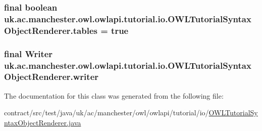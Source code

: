 \hypertarget{classuk_1_1ac_1_1manchester_1_1owl_1_1owlapi_1_1tutorial_1_1io_1_1_o_w_l_tutorial_syntax_object_renderer_add9e1ee82d33606829cfa9a5e04b6dd6}{
\subsubsection[{tables}]{\setlength{\rightskip}{0pt plus 5cm}final boolean uk.\-ac.\-manchester.\-owl.\-owlapi.\-tutorial.\-io.\-O\-W\-L\-Tutorial\-Syntax\-Object\-Renderer.\-tables = true\hspace{0.3cm}{\ttfamily [private]}}}\label{classuk_1_1ac_1_1manchester_1_1owl_1_1owlapi_1_1tutorial_1_1io_1_1_o_w_l_tutorial_syntax_object_renderer_add9e1ee82d33606829cfa9a5e04b6dd6}
\hypertarget{classuk_1_1ac_1_1manchester_1_1owl_1_1owlapi_1_1tutorial_1_1io_1_1_o_w_l_tutorial_syntax_object_renderer_ab482bfbe8cd84b9426edb5cdea576ef6}{
\subsubsection[{writer}]{\setlength{\rightskip}{0pt plus 5cm}final Writer uk.\-ac.\-manchester.\-owl.\-owlapi.\-tutorial.\-io.\-O\-W\-L\-Tutorial\-Syntax\-Object\-Renderer.\-writer\hspace{0.3cm}{\ttfamily [private]}}}\label{classuk_1_1ac_1_1manchester_1_1owl_1_1owlapi_1_1tutorial_1_1io_1_1_o_w_l_tutorial_syntax_object_renderer_ab482bfbe8cd84b9426edb5cdea576ef6}


The documentation for this class was generated from the following file\-:\begin{DoxyCompactItemize}
\item 
contract/src/test/java/uk/ac/manchester/owl/owlapi/tutorial/io/\hyperlink{test_2java_2uk_2ac_2manchester_2owl_2owlapi_2tutorial_2io_2_o_w_l_tutorial_syntax_object_renderer_8java}{O\-W\-L\-Tutorial\-Syntax\-Object\-Renderer.\-java}\end{DoxyCompactItemize}
